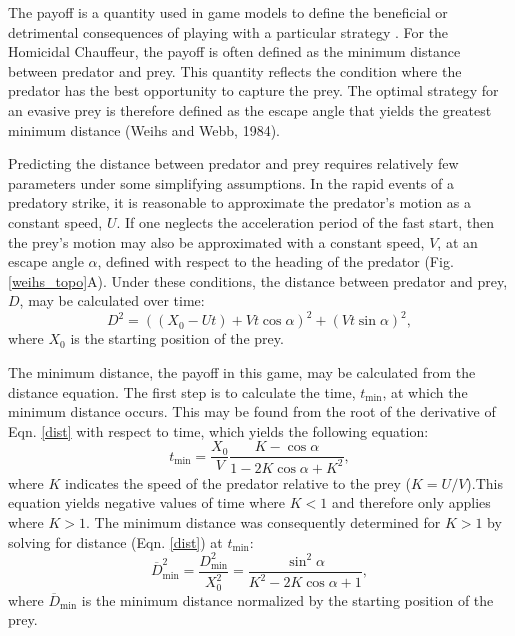 \documentclass[12pt]{article}
\newcommand{\ol}{\overline}
\begin{document}
The payoff is a quantity used in game models to define the beneficial or detrimental consequences of playing with a particular strategy \citep{Webb:2007hg}. For the Homicidal Chauffeur, the payoff is often defined as the minimum distance between predator and prey. 
This quantity reflects the condition where the predator has the best opportunity to capture the prey. The optimal strategy for an evasive prey is therefore defined as the escape angle that yields the greatest minimum distance (Weihs and Webb, 1984).

Predicting the distance between predator and prey requires relatively few parameters under some simplifying assumptions. In the rapid events of a predatory strike, it is reasonable to approximate the predator's motion as a constant speed, $U$. 
If one neglects the acceleration period of the fast start, then the prey's motion may also be approximated with a constant speed, $V$, at an escape angle $\alpha$, defined with respect to the heading of the predator (Fig. \ref{weihs_topo}A). Under these conditions, the distance between predator and prey, $D$, may be calculated over time:
%
\begin{equation}
D^2 = ((X_0 - Ut) + Vt\cos\alpha)^2 + (Vt\sin\alpha)^2,
\label{dist}
\end{equation}
%
where $X_0$ is the starting position of the prey.

The minimum distance, the payoff in this game, may be calculated from the distance equation. The first step is to calculate the time, $t_{\text{min}}$,  at which the minimum distance occurs. This may be found from the root of the derivative of Eqn. \ref{dist} with respect to time, which yields the following equation:
%
\begin{equation}
t_{\text{min}} = \frac{X_0}{V} \frac{K-\cos\alpha}{1-2 K\cos\alpha+K^2},
\label{eq33weihs}	
\end{equation}
%
where $K$ indicates the speed of the predator relative to the prey ($K = U/V$).This equation yields negative values of time where $K<1$ and therefore only applies where $K>1$. The minimum distance was consequently determined for $K>1$ by solving for distance (Eqn. \ref{dist}) at $t_{\text{min}}$:
%
\begin{equation}
\ol D_{\text{min}}^2 = \frac{D_{\text{min}}^2}{X_0^2} = \frac{\sin^2\alpha}{K^2 - 2K \cos\alpha + 1},
\label{dmin}
\end{equation}
where $\ol D_{\text{min}}$ is the minimum distance normalized by the starting position of the prey.
\end{document}

